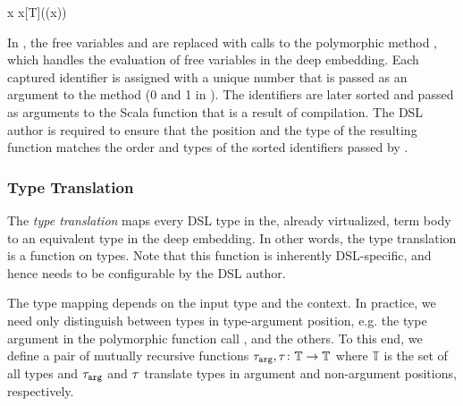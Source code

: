     \infyy{}
          { \quad x\;\;\;\;}
          {x}{[T]((x))}

  In , the free variables
   and  are replaced with calls to the polymorphic method
  , which handles the evaluation of free variables in the deep
  embedding. Each captured identifier is assigned with a unique number that
  is passed as an argument to the  method
   (0 and 1 in ).
  The identifiers are later sorted and passed as arguments to the Scala function that is a result
  of \edsl compilation. The DSL author is required to ensure that the position and the type
  of the resulting function matches the order and types of the sorted identifiers passed by \yy.

\subsubsection{Type Translation}
\label{sec:type-translation}
 The \emph{type translation} maps every DSL type in the, already
  virtualized, term body to an equivalent type in the deep embedding.
  In other words, the type translation is a function on
  types.  Note that this function is inherently DSL-specific, and
  hence needs to be configurable by the DSL author.


  The type mapping depends on the input type and the context. In
  practice, we need only distinguish between types in type-argument
  position, e.g. the type argument  in the polymorphic
  function call , and the others.  To this end, we
  define a pair of mutually recursive functions $\ttarg, \ttother
  \colon \mathbb{T} \rightarrow \mathbb{T}$ where $\mathbb{T}$ is the
  set of all types and $\ttarg$ and $\ttother$ translate types in
  argument and non-argument positions, respectively.

